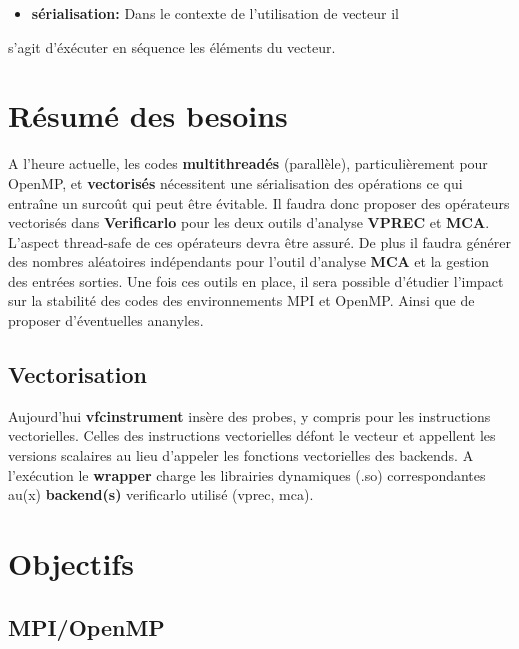 \documentclass[11pt]{article}
\begin{document}
\begin{itemize}
\item \textbf{sérialisation:} Dans le contexte de l'utilisation de vecteur il
\end{itemize}
s'agit d'éxécuter en séquence les éléments du vecteur.

\section{Résumé des besoins}
\label{sec:orgefc274e}

A l'heure actuelle, les codes \textbf{multithreadés} (parallèle),
particulièrement pour OpenMP, et \textbf{vectorisés} nécessitent une 
sérialisation des opérations ce qui entraîne un surcoût qui peut
être évitable.
\vspace{5mm}
Il faudra donc proposer des opérateurs vectorisés dans \textbf{Verificarlo}
pour les deux outils d'analyse \textbf{VPREC} et \textbf{MCA}.
\vspace{5mm}
L'aspect thread-safe de ces opérateurs devra être assuré.
\vspace{5mm}
De plus il faudra générer des nombres aléatoires indépendants pour
l'outil d'analyse \textbf{MCA} et la gestion des entrées sorties.
\vspace{5mm}
Une fois ces outils en place, il sera possible d'étudier l'impact
sur la stabilité des codes des environnements MPI et OpenMP. Ainsi
que de proposer d'éventuelles ananyles.

\subsection{Vectorisation}
\label{sec:org91a1fd9}

Aujourd’hui \textbf{vfcinstrument} insère des probes, y compris pour les
instructions vectorielles.
\vspace{5mm}
Celles des instructions vectorielles défont le vecteur et appellent les
versions scalaires au lieu d'appeler les fonctions vectorielles des
backends.
\vspace{5mm}
A l’exécution le \textbf{wrapper} charge les librairies dynamiques (.so)
correspondantes au(x) \textbf{backend(s)} verificarlo utilisé (vprec, mca).

\section{Objectifs}
\label{sec:org5e38bc7}
\subsection{MPI/OpenMP}
\label{sec:org9a5fe9a}
\end{document}
